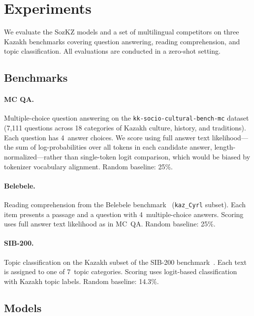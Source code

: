 \section{Experiments}
\label{sec:experiments}

We evaluate the SozKZ models and a set of multilingual competitors on
three Kazakh benchmarks covering question answering, reading comprehension,
and topic classification. All evaluations are conducted in a zero-shot setting.

\subsection{Benchmarks}
\label{sec:benchmarks}

\paragraph{MC QA.}
Multiple-choice question answering on the \texttt{kk-socio-cultural-bench-mc}
dataset (7,111 questions across 18 categories of Kazakh culture, history, and
traditions). Each question has 4~answer choices. We score using full answer text
likelihood---the sum of log-probabilities over all tokens in each candidate
answer, length-normalized---rather than single-token logit comparison, which
would be biased by tokenizer vocabulary alignment. Random baseline: 25\%.

\paragraph{Belebele.}
Reading comprehension from the Belebele benchmark~\citep{bandarkar2023belebele}
(\texttt{kaz\_Cyrl} subset). Each item presents a passage and a question with
4~multiple-choice answers. Scoring uses full answer text likelihood as in MC~QA.
Random baseline: 25\%.

\paragraph{SIB-200.}
Topic classification on the Kazakh subset of the SIB-200
benchmark~\citep{adelani2024sib200}. Each text is assigned to one of 7~topic
categories. Scoring uses logit-based classification with Kazakh topic labels.
Random baseline: 14.3\%.

\subsection{Models}
\label{sec:models}

